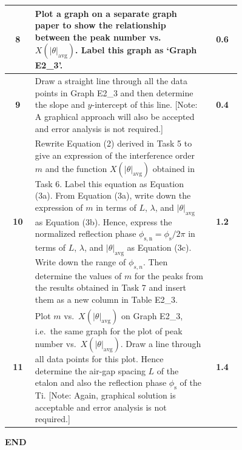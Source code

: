 \begin{tabular}{|c|p{0.76\linewidth}|c|}
\textbf{8} & Plot a graph on a separate graph paper to show the relationship between the peak number vs.\ $X(|\theta|_\mathrm{avg})$. Label this graph as `Graph E2\_3'. & \textbf{0.6} \\ \hline
\textbf{9} & Draw a straight line through all the data points in Graph E2\_3 and then determine the slope and $y$-intercept of this line. [Note: A graphical approach will also be accepted and error analysis is not required.] & \textbf{0.4} \\ \hline
\textbf{10} & Rewrite Equation (2) derived in Task 5 to give an expression of the interference order $m$ and the function $X(|\theta|_\mathrm{avg})$ obtained in Task 6. Label this equation as Equation (3a). From Equation (3a), write down the expression of $m$ in terms of $L$, $\lambda$, and $|\theta|_\mathrm{avg}$ as Equation (3b). Hence, express the normalized reflection phase $\phi_\mathrm{s,n} = \phi_\mathrm{s}/2\pi$ in terms of $L$, $\lambda$, and $|\theta|_\mathrm{avg}$ as Equation (3c). Write down the range of $\phi_{s,n}$. Then determine the values of $m$ for the peaks from the results obtained in Task 7 and insert them as a new column in Table E2\_3. & \textbf{1.2} \\ \hline
\textbf{11} & Plot $m$ vs.\ $X(|\theta|_\mathrm{avg})$ on Graph E2\_3, i.e.\ the same graph for the plot of peak number vs.\ $X(|\theta|_\mathrm{avg})$. Draw a line through all data points for this plot. Hence determine the air-gap spacing $L$ of the etalon and also the reflection phase $\phi_\mathrm{s}$ of the Ti. [Note: Again, graphical solution is acceptable and error analysis is not required.] & \textbf{1.4} \\ \hline
\end{tabular}

\begin{center}\textbf{END}\end{center}
